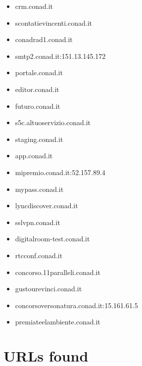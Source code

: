 \documentclass{article}
\begin{document}
\begin{itemize}
        \item crm.conad.it
    
        \item scontatievincenti.conad.it
    
        \item conadrad1.conad.it
    
        \item smtp2.conad.it:151.13.145.172
    
        \item portale.conad.it
    
        \item editor.conad.it
    
        \item futuro.conad.it
    
        \item s5c.altuoservizio.conad.it
    
        \item staging.conad.it
    
        \item app.conad.it
    
        \item mipremio.conad.it:52.157.89.4
    
        \item mypass.conad.it
    
        \item lyncdiscover.conad.it
    
        \item sslvpn.conad.it
    
        \item digitalroom-test.conad.it
    
        \item rtcconf.conad.it
    
        \item concorso.11paralleli.conad.it
    
        \item gustourevinci.conad.it
    
        \item concorsoversonatura.conad.it:15.161.61.5
    
        \item premiateelambiente.conad.it
    
\end{itemize}


\section*{URLs found}
\end{document}
